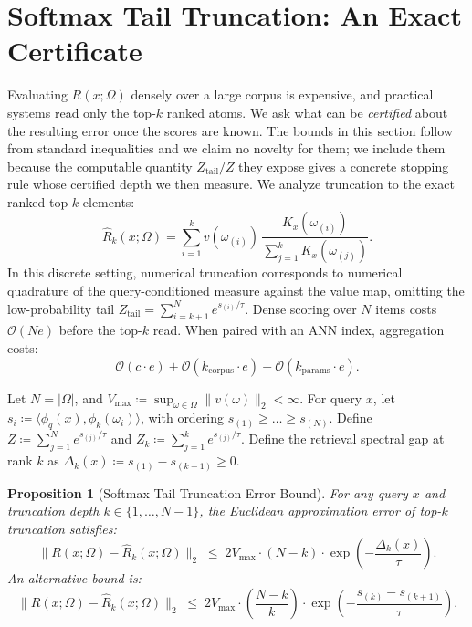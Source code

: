 \documentclass[preprint,12pt]{elsarticle}
\newtheorem{proposition}{Proposition}
\newcommand{\Om}{\Omega}
\begin{document}
\section{Softmax Tail Truncation: An Exact Certificate}
\label{sec:quadrature}

Evaluating $R(x; \Om)$ densely over a large corpus is expensive, and practical systems read only the top-$k$ ranked atoms. We ask what can be \emph{certified} about the resulting error once the scores are known. The bounds in this section follow from standard inequalities and we claim no novelty for them; we include them because the computable quantity $Z_{\mathrm{tail}}/Z$ they expose gives a concrete stopping rule whose certified depth we then measure. We analyze truncation to the exact ranked top-$k$ elements:
\[
  \hat{R}_k(x; \Om) = \sum_{i=1}^k v(\omega_{(i)})\, \frac{K_x(\omega_{(i)})}{\sum_{j=1}^k K_x(\omega_{(j)})}.
\]
In this discrete setting, numerical truncation corresponds to numerical quadrature of the query-conditioned measure against the value map, omitting the low-probability tail $Z_{\mathrm{tail}} = \sum_{i=k+1}^N e^{s_{(i)}/\tau}$. Dense scoring over $N$ items costs $\mathcal{O}(Ne)$ before the top-$k$ read. When paired with an ANN index, aggregation costs:
\[
  \mathcal{O}(c \cdot e) + \mathcal{O}(k_{\mathrm{corpus}} \cdot e) + \mathcal{O}(k_{\mathrm{params}} \cdot e).
\]

Let $N = |\Om|$, and $V_{\max} \coloneqq \sup_{\omega \in \Om} \|v(\omega)\|_2 < \infty$. For query $x$, let $s_i \coloneqq \langle \phi_q(x), \phi_k(\omega_i) \rangle$, with ordering $s_{(1)} \ge \dots \ge s_{(N)}$. Define $Z \coloneqq \sum_{j=1}^N e^{s_{(j)}/\tau}$ and $Z_k \coloneqq \sum_{j=1}^k e^{s_{(j)}/\tau}$. Define the retrieval spectral gap at rank $k$ as $\Delta_k(x) \coloneqq s_{(1)} - s_{(k+1)} \ge 0$.

\begin{proposition}[Softmax Tail Truncation Error Bound]
\label{thm:quadrature_bound}
For any query $x$ and truncation depth $k \in \{1, \dots, N-1\}$, the Euclidean approximation error of top-$k$ truncation satisfies:
\[
  \| R(x; \Om) - \hat{R}_k(x; \Om) \|_2 \;\le\; 2 V_{\max} \cdot (N - k) \cdot \exp\left( -\frac{\Delta_k(x)}{\tau} \right).
\]
An alternative bound is:
\[
  \| R(x; \Om) - \hat{R}_k(x; \Om) \|_2 \;\le\; 2 V_{\max} \cdot \left(\frac{N - k}{k}\right) \cdot \exp\left( -\frac{s_{(k)} - s_{(k+1)}}{\tau} \right).
\]
\end{proposition}
\end{document}
